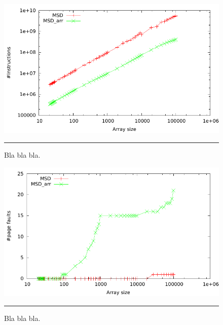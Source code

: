 \begin{figure}[htbp]
	\centering
		\includegraphics[width=\textwidth]{./Figures/Project2b/Instructions.pdf}
		\rule{35em}{0.5pt}
	\caption[Instructions]{
	Bla bla bla.
	}
	\label{fig:Instructions_p2b}
\end{figure}

\begin{figure}[htbp]
	\centering
		\includegraphics[width=\textwidth]{./Figures/Project2b/Page_faults.pdf}
		\rule{35em}{0.5pt}
	\caption[Page faults]{
	Bla bla bla.
	}
	\label{fig:Page_faults_p2b}
\end{figure}


